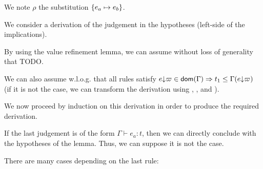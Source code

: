 \documentclass[a4paper]{article}
\theoremstyle{definition}
\begin{document}
        We note $\rho$ the substitution $\{e_a \mapsto e_b\}$.

        We consider a derivation of the judgement in the hypotheses (left-side of the implications).

        By using the value refinement lemma, we can assume without loss of generality that TODO.

        We can also assume w.l.o.g. that all rules  satisfy
        $e{\downarrow}\varpi \in\textsf{dom}(\Gamma) \Rightarrow t_1 \leq \Gamma(e{\downarrow}\varpi)$ (if it is not the case,
        we can transform the derivation using , ,  and ).

        We now proceed by induction on this derivation in order to produce the required derivation.
        
        If the last judgement is of the form $\Gamma \vdash e_a: t$, then we can directly conclude with the hypotheses of the lemma.
        Thus, we can suppose it is not the case.

        There are many cases depending on the last rule:
\end{document}
